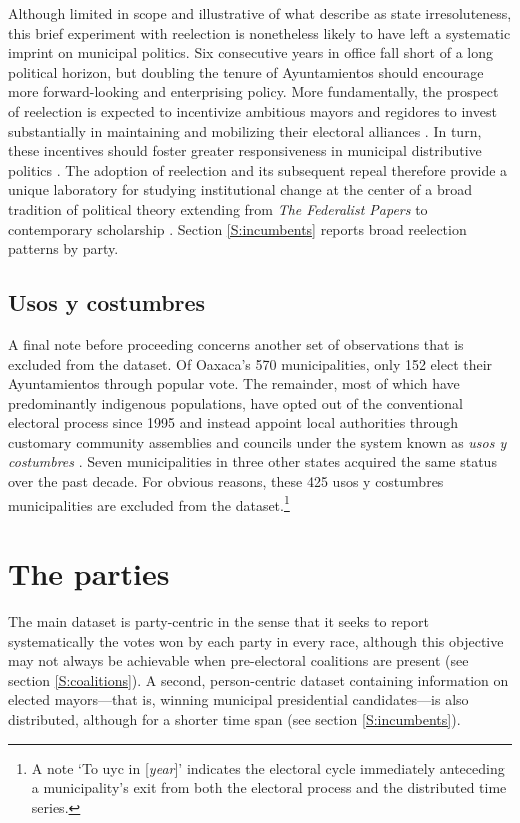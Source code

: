 \documentclass[letter,12pt]{article}
\begin{document}
Although limited in scope and illustrative of what \citet{cox.mccubbins.2001} describe as state irresoluteness, this brief experiment with reelection is nonetheless likely to have left a systematic imprint on municipal politics. Six consecutive years in office fall short of a long political horizon, but doubling the tenure of Ayuntamientos should encourage more forward-looking and enterprising policy. More fundamentally, the prospect of reelection is expected to incentivize ambitious mayors and regidores to invest substantially in maintaining and mobilizing their electoral alliances \citep{cain.etal.1987, motolinia-reel-pork2021}. In turn, these incentives should foster greater responsiveness in municipal distributive politics \citep{cox.mccubbins.1986, jacobson.kernell.1983}. The adoption of reelection and its subsequent repeal therefore provide a unique laboratory for studying institutional change at the center of a broad tradition of political theory extending from \emph{The Federalist Papers} to contemporary scholarship \citep{madison.etal.1788, mayhew.1974, schlesinger.1966, miller.hammond.1989}. Section \ref{S:incumbents} reports broad reelection patterns by party.

\subsection{Usos y costumbres}\label{S:uyc}
A final note before proceeding concerns another set of observations that is excluded from the dataset. Of Oaxaca's 570 municipalities, only 152 elect their Ayuntamientos through popular vote. The remainder, most of which have predominantly indigenous populations, have opted out of the conventional electoral process since 1995 and instead appoint local authorities through customary community assemblies and councils under the system known as \emph{usos y costumbres} \citep[see][]{elizarraras.2002, eisenstadt.rios.uyc.2014, magaloni.etal.2021}. Seven municipalities in three other states acquired the same status over the past decade. For obvious reasons, these 425 usos y costumbres municipalities are excluded from the dataset.\footnote{A note `To uyc in [\emph{year}]' indicates the electoral cycle immediately anteceding a municipality's exit from both the electoral process and the distributed time series.}

\section{The parties}
The main dataset is party-centric in the sense that it seeks to report systematically the votes won by each party in every race, although this objective may not always be achievable when pre-electoral coalitions are present (see section \ref{S:coalitions}). A second, person-centric dataset containing information on elected mayors---that is, winning municipal presidential candidates---is also distributed, although for a shorter time span (see section \ref{S:incumbents}). 
\end{document}
